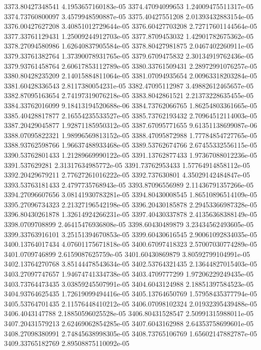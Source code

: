 {3373.80427348541 4.1953657160183e-05
3374.47094099653 1.24009475511317e-05
3374.73760800097 3.4579948590887e-05
3375.40427551208 2.01393432883154e-05
3376.00427627208 3.40851012729644e-05
3376.60427703208 2.72717601144564e-05
3377.33761129431 1.25009244912703e-05
3377.8709453032 1.42901782675362e-05
3378.27094580986 1.62640837905584e-05
3378.80427981875 2.0467402260911e-05
3379.33761382764 1.37390078931765e-05
3379.6709475832 2.30134919762436e-05
3379.93761458764 2.60617853112789e-05
3380.33761509431 2.28972991076257e-05
3380.80428235209 2.14015884811064e-05
3381.07094935654 2.00963318203284e-05
3381.60428336543 2.8117380054231e-05
3382.47095112987 3.49882612465657e-05
3382.87095163654 2.74197319076218e-05
3383.8042861521 2.21373228635455e-05
3384.33762016099 9.18413194520688e-06
3384.73762066765 1.86254803361665e-05
3385.40428817877 2.16554235533527e-05
3385.73762193432 2.70964512114003e-05
3387.20429045877 1.92871185950312e-05
3387.67095771655 9.61351138699087e-06
3388.07095822321 1.98996569813152e-05
3388.47095872988 1.77784854727765e-05
3388.93762598766 1.96637488933468e-05
3389.53762674766 2.67455332556115e-05
3390.53762801433 1.21289669990122e-05
3391.13762877433 1.97367088012236e-05
3391.537629281 2.31317634985772e-05
3391.73762953433 1.57764914858112e-05
3392.20429679211 2.77627261016222e-05
3392.737630801 4.35029142484847e-05
3393.53763181433 2.4797735768943e-05
3393.87096556989 2.11436791357266e-05
3394.27096607656 3.08141930783281e-05
3394.80430008545 1.86510896514109e-05
3395.27096734323 2.21327196542198e-05
3396.20430185878 2.29453366987328e-05
3396.80430261878 1.32614924266231e-05
3397.40430337878 2.41356368388149e-05
3398.0709708899 2.46415476936808e-05
3398.60430489879 3.23434562493605e-05
3399.33763916101 3.25151394670853e-05
3399.60430616545 2.90061092834035e-05
3400.13764017434 4.07601175671818e-05
3400.67097418323 2.57007030774289e-05
3401.0709746899 2.6159087625759e-05
3401.60430869879 3.80592799104991e-05
3402.13764270768 3.85144478543634e-05
3402.53764321435 2.13644827015403e-05
3403.27097747657 1.94674741334738e-05
3403.4709777299 1.97206229249435e-05
3403.73764473435 3.03859245507991e-05
3404.6043124988 2.18851397584523e-05
3404.93764625435 1.72619099494416e-05
3405.13764650769 1.57958435377794e-05
3405.53764701435 2.11576448410212e-05
3406.07098102324 2.01932395439488e-05
3406.4043147788 2.18850596025528e-05
3406.80431528547 2.50991315988011e-05
3407.20431579213 2.62469062854285e-05
3407.6043162988 2.64353758699601e-05
3408.27098380991 2.74845638998305e-05
3408.73765106769 1.65602147882787e-05
3409.33765182769 2.89508875110092e-05
}
